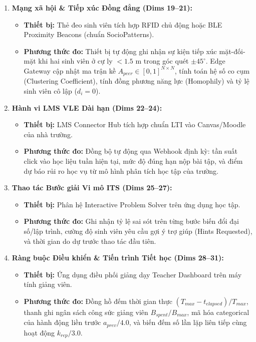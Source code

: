 \begin{enumerate}[label=\textbf{Nhóm \arabic*.}]
  \item \textbf{Mạng xã hội \& Tiếp xúc Đồng đẳng (Dims 19--21):}
  \begin{itemize}
    \item \textbf{Thiết bị:} Thẻ đeo sinh viên tích hợp RFID chủ động hoặc BLE Proximity Beacons (chuẩn SocioPatterns).
    \item \textbf{Phương thức đo:} Thiết bị tự động ghi nhận sự kiện tiếp xúc mặt-đối-mặt khi hai sinh viên ở cự ly $< 1.5\text{ m}$ trong góc quét $\pm 45^\circ$. Edge Gateway cập nhật ma trận kề $A_{peer} \in [0, 1]^{N \times N}$, tính toán hệ số co cụm (Clustering Coefficient), tính đồng phương năng lực (Homophily) và tỷ lệ sinh viên cô lập ($d_i = 0$).
  \end{itemize}

  \item \textbf{Hành vi LMS VLE Dài hạn (Dims 22--24):}
  \begin{itemize}
    \item \textbf{Thiết bị:} LMS Connector Hub tích hợp chuẩn LTI vào Canvas/Moodle của nhà trường.
    \item \textbf{Phương thức đo:} Đồng bộ tự động qua Webhook định kỳ: tần suất click vào học liệu tuần hiện tại, mức độ đúng hạn nộp bài tập, và điểm dự báo rủi ro học vụ từ mô hình phân tích học tập của trường.
  \end{itemize}

  \item \textbf{Thao tác Bước giải Vi mô ITS (Dims 25--27):}
  \begin{itemize}
    \item \textbf{Thiết bị:} Phân hệ Interactive Problem Solver trên ứng dụng học tập.
    \item \textbf{Phương thức đo:} Ghi nhận tỷ lệ sai sót trên từng bước biến đổi đại số/lập trình, cường độ sinh viên yêu cầu gợi ý trợ giúp (Hints Requested), và thời gian do dự trước thao tác đầu tiên.
  \end{itemize}

  \item \textbf{Ràng buộc Điều khiển \& Tiến trình Tiết học (Dims 28--31):}
  \begin{itemize}
    \item \textbf{Thiết bị:} Ứng dụng điều phối giảng dạy Teacher Dashboard trên máy tính giảng viên.
    \item \textbf{Phương thức đo:} Đồng hồ đếm thời gian thực $(T_{max} - t_{elapsed}) / T_{max}$, thanh ghi ngân sách công sức giảng viên $B_{spent} / B_{max}$, mã hóa categorical của hành động liền trước $a_{prev} / 4.0$, và biến đếm số lần lặp liên tiếp cùng hoạt động $k_{rep} / 3.0$.
  \end{itemize}
\end{enumerate}

